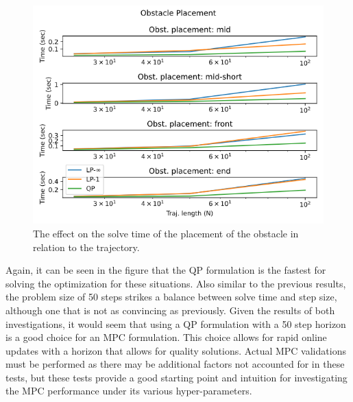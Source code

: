 \begin{figure}
    \centering
    \includegraphics[width=\linewidth]{figs/Obstacle_Placement.png}
    \caption{The effect on the solve time of the placement of the obstacle in relation to the trajectory.}
    \label{fig:obstacle_placement}
\end{figure}

Again, it can be seen in the figure that the QP formulation is the fastest for solving the optimization for these situations. Also similar to the previous results, the problem size of 50 steps strikes a balance between solve time and step size, although one that is not as convincing as previously. Given the results of both investigations, it would seem that using a QP formulation with a 50 step horizon is a good choice for an MPC formulation. This choice allows for rapid online updates with a horizon that allows for quality solutions. Actual MPC validations must be performed as there may be additional factors not accounted for in these tests, but these tests provide a good starting point and intuition for investigating the MPC performance under its various hyper-parameters.

